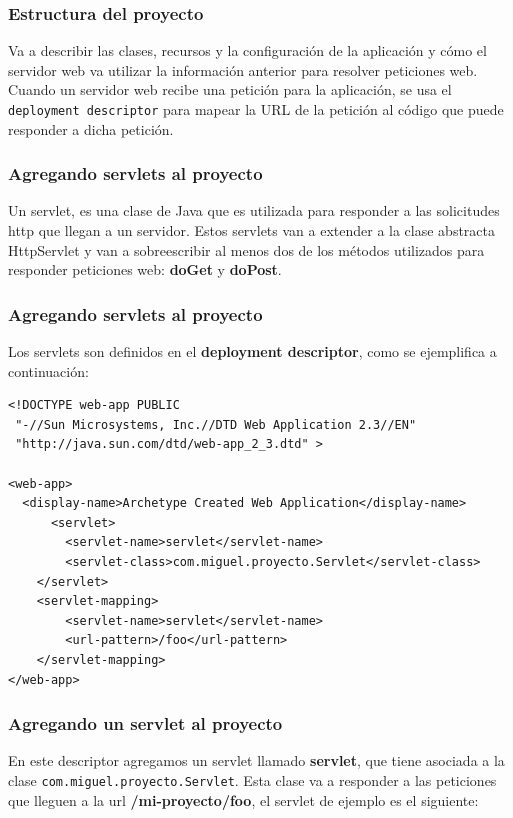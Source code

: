 \documentclass{beamer}
\begin{document}
\begin{frame}
  \frametitle{Estructura del proyecto}
  Va a describir las clases, recursos y la configuración de la aplicación y cómo
  el servidor web va utilizar la información anterior para resolver peticiones
  web. Cuando un servidor web recibe una petición para la aplicación, se usa el
  \texttt{deployment descriptor}  para mapear la URL de la petición al código que puede
  responder a dicha petición.
\end{frame}

\begin{frame}
  \frametitle{Agregando servlets al proyecto}
  Un servlet, es una clase de Java que es utilizada para responder a las
  solicitudes http que llegan a un servidor. Estos servlets van a extender a la
  clase abstracta HttpServlet y van a sobreescribir al menos dos de los métodos
  utilizados para responder peticiones web: \textbf{doGet} y \textbf{doPost}.
\end{frame}

\begin{frame}[fragile]
  \frametitle{Agregando servlets al proyecto}
  Los servlets son definidos en el \textbf{deployment descriptor}, como se ejemplifica a
  continuación:

  \begin{verbatim}
<!DOCTYPE web-app PUBLIC
 "-//Sun Microsystems, Inc.//DTD Web Application 2.3//EN"
 "http://java.sun.com/dtd/web-app_2_3.dtd" >

<web-app>
  <display-name>Archetype Created Web Application</display-name>
      <servlet>
        <servlet-name>servlet</servlet-name>
        <servlet-class>com.miguel.proyecto.Servlet</servlet-class>
    </servlet>
    <servlet-mapping>
        <servlet-name>servlet</servlet-name>
        <url-pattern>/foo</url-pattern>
    </servlet-mapping>
</web-app>
  \end{verbatim}
\end{frame}


\begin{frame}[fragile]
  \frametitle{Agregando un servlet al proyecto}
  En este descriptor agregamos un servlet llamado \textbf{servlet}, que tiene asociada a la
  clase \texttt{com.miguel.proyecto.Servlet}. Esta clase va a responder a las peticiones
  que lleguen a la url \textbf{/mi-proyecto/foo}, el servlet de ejemplo es el siguiente:
\end{frame}
\end{document}
